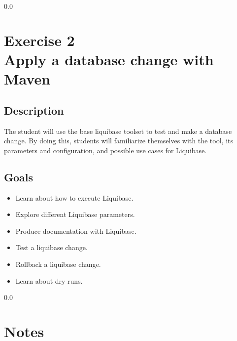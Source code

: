 {\setlength{\baselineskip}%
  {0.0\baselineskip}
  \section*{\flushright Exercise 2\\
  Apply a database change with Maven}
  \hrulefill \par}

\subsection*{Description}
The student will use the base liquibase toolset to test and make a database
change. By doing this, students will familiarize themselves with the
tool, its parameters and configuration, and possible use cases for Liquibase.


\subsection*{Goals}
\begin{itemize}
  \item Learn about how to execute Liquibase.
  \item Explore different Liquibase parameters.
  \item Produce documentation with Liquibase.
  \item Test a liquibase change.
  \item Rollback a liquibase change.
  \item Learn about dry runs.
\end{itemize}

\newpage
  {\setlength{\baselineskip}%
           {0.0\baselineskip}
  \section*{Notes}
  \hrulefill \par}

